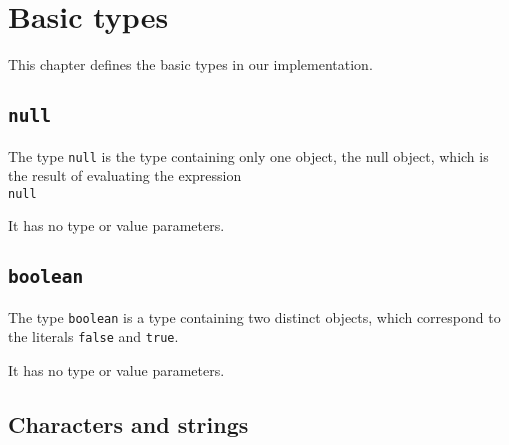 
\section{Basic types}\label{chap:BasicTypes}

This chapter defines the basic types in our implementation.

\subsection{\tt null}

The type {\tt null} is the type containing only one object, the null
object, which is the result of evaluating the expression\\ 
{\tt null}

It has no type or value parameters.

\subsection{\tt boolean}

The type {\tt boolean} is a type containing two distinct objects,
which correspond to the literals {\tt false} and {\tt true}.

It has no type or value parameters.

\subsection{Characters and strings}








